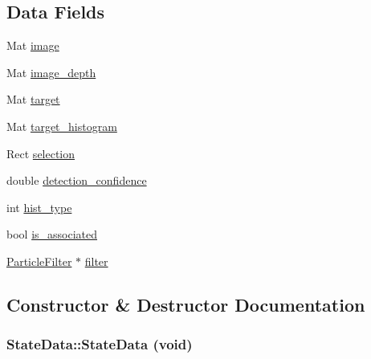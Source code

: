 \subsection*{Data Fields}
\begin{DoxyCompactItemize}
\item 
Mat \hyperlink{classStateData_ab1a1e2be2b9a55c78bc579024d30cf64}{image}
\item 
Mat \hyperlink{classStateData_a662c82a423f855845f2be8700af72817}{image\_\-depth}
\item 
Mat \hyperlink{classStateData_ac778c44e62237a225361a80894a48ee8}{target}
\item 
Mat \hyperlink{classStateData_af93e02e6025c07b7a383b2e755f52dca}{target\_\-histogram}
\item 
Rect \hyperlink{classStateData_afea0bc5d1743e2db008238bfe9f574ce}{selection}
\item 
double \hyperlink{classStateData_abe87d63070a9fc98cd9f1475495725e6}{detection\_\-confidence}
\item 
int \hyperlink{classStateData_a14b4b6d403b4517d7102f49a501d51ed}{hist\_\-type}
\item 
bool \hyperlink{classStateData_ad5f3d2a522bfdcff47e7d028bf19f012}{is\_\-associated}
\item 
\hyperlink{classParticleFilter}{ParticleFilter} $\ast$ \hyperlink{classStateData_a42c35fd351a6634b67fd1fd2f5a09cf4}{filter}
\end{DoxyCompactItemize}


\subsection{Constructor \& Destructor Documentation}
\hypertarget{classStateData_a3bbfa4301403ebf5d24d5d16cf246b88}{
\subsubsection[{StateData}]{\setlength{\rightskip}{0pt plus 5cm}StateData::StateData (void)}}
\label{classStateData_a3bbfa4301403ebf5d24d5d16cf246b88}


